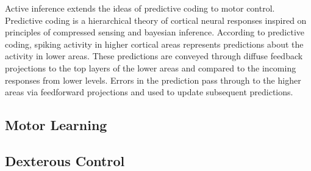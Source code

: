 Active inference extends the ideas of predictive coding to motor control. Predictive coding is a hierarchical theory of cortical neural responses inspired on principles of compressed sensing and bayesian inference. According to predictive coding, spiking activity in higher cortical areas represents predictions about the activity in lower areas. These predictions are conveyed through diffuse feedback projections to the top layers of the lower areas and compared to the incoming responses from lower levels. Errors in the prediction pass through to the higher areas via feedforward projections and used to update subsequent predictions.

\subsection{Motor Learning}

\subsection{Dexterous Control}
